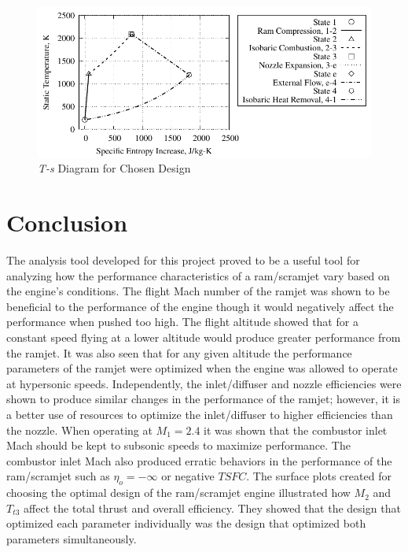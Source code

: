 \documentclass[conf]{new-aiaa} %
\begin{document}
\begin{figure}[H] %
    \centering
    \includegraphics[]{media/ts_plot_files/TS_plot_for_design.pdf}
    \caption{\label{fig:partits}\texorpdfstring{\textit{T-s}}{Ts} Diagram for Chosen Design}
\end{figure}


\section{Conclusion}
The analysis tool developed for this project proved to be a useful tool for analyzing how the performance characteristics of a ram/scramjet vary based on the engine's conditions. The flight Mach number of the ramjet was shown to be beneficial to the performance of the engine though it would negatively affect the performance when pushed too high. The flight altitude showed that for a constant speed flying at a lower altitude would produce greater performance from the ramjet. It was also seen that for any given altitude the performance parameters of the ramjet were optimized when the engine was allowed to operate at hypersonic speeds. Independently, the inlet/diffuser and nozzle efficiencies were shown to produce similar changes in the performance of the ramjet; however, it is a better use of resources to optimize the inlet/diffuser to higher efficiencies than the nozzle. When operating at $M_1=2.4$ it was shown that the combustor inlet Mach should be kept to subsonic speeds to maximize performance. The combustor inlet Mach also produced erratic behaviors in the performance of the ram/scramjet such as $\eta_o=-\infty$ or negative $TSFC$. The surface plots created for choosing the optimal design of the ram/scramjet engine illustrated how $M_2$ and $T_{t3}$ affect the total thrust and overall efficiency. They showed that the design that optimized each parameter individually was the design that optimized both parameters simultaneously.
\end{document}
